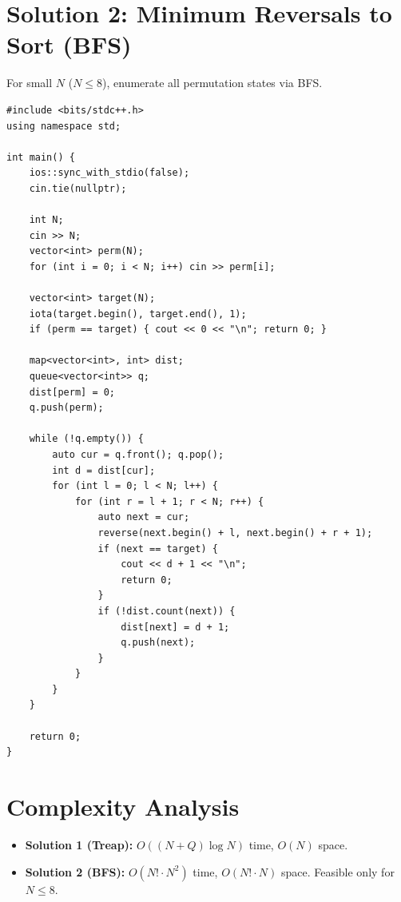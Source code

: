 \documentclass[11pt,a4paper]{article}
\begin{document}
\section{Solution 2: Minimum Reversals to Sort (BFS)}

For small $N$ ($N \le 8$), enumerate all permutation states via BFS.

\begin{lstlisting}
#include <bits/stdc++.h>
using namespace std;

int main() {
    ios::sync_with_stdio(false);
    cin.tie(nullptr);

    int N;
    cin >> N;
    vector<int> perm(N);
    for (int i = 0; i < N; i++) cin >> perm[i];

    vector<int> target(N);
    iota(target.begin(), target.end(), 1);
    if (perm == target) { cout << 0 << "\n"; return 0; }

    map<vector<int>, int> dist;
    queue<vector<int>> q;
    dist[perm] = 0;
    q.push(perm);

    while (!q.empty()) {
        auto cur = q.front(); q.pop();
        int d = dist[cur];
        for (int l = 0; l < N; l++) {
            for (int r = l + 1; r < N; r++) {
                auto next = cur;
                reverse(next.begin() + l, next.begin() + r + 1);
                if (next == target) {
                    cout << d + 1 << "\n";
                    return 0;
                }
                if (!dist.count(next)) {
                    dist[next] = d + 1;
                    q.push(next);
                }
            }
        }
    }

    return 0;
}
\end{lstlisting}

\section{Complexity Analysis}
\begin{itemize}
  \item \textbf{Solution 1 (Treap):} $O((N + Q) \log N)$ time,
        $O(N)$ space.
  \item \textbf{Solution 2 (BFS):} $O(N! \cdot N^2)$ time,
        $O(N! \cdot N)$ space. Feasible only for $N \le 8$.
\end{itemize}
\end{document}
